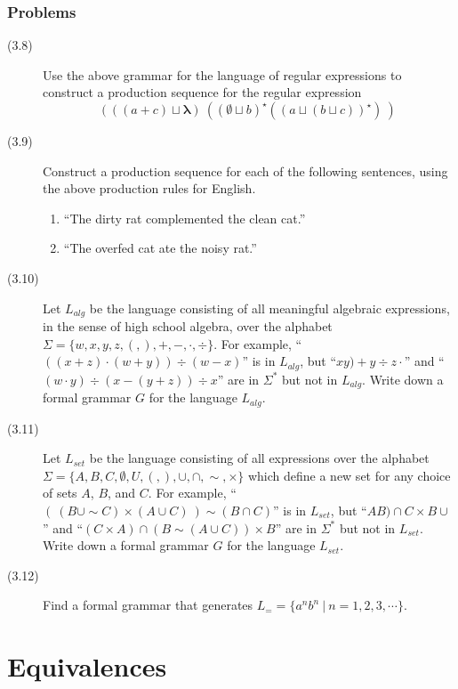 \documentclass{article}
\newcommand{\emptysetb}{\mathbf \emptyset}
\newcommand{\lambdab}{\mathbf \lambda}
\begin{document}
\subsubsection*{Problems}

\begin{description}
  \item[(3.8)] Use the above grammar for the language of regular expressions to construct a production sequence for the regular expression
    \begin{equation*}
    (\ ((a+c) \sqcup \lambdab)\ ( (\emptysetb \sqcup b)^\star ((a \sqcup (b \sqcup c))^\star ) \ )
    \end{equation*}
  \item[(3.9)] Construct a production sequence for each of the following sentences, using the above production rules for English.
    \begin{enumerate}
      \item ``The dirty rat complemented the clean cat.''
      \item ``The overfed cat ate the noisy rat.''
    \end{enumerate}
  \item[(3.10)] Let $L_{alg}$ be the language consisting of all meaningful algebraic expressions, in the sense of high school algebra, over the alphabet $\Sigma = \{ w,x,y,z,(,),+,-,\cdot,\div \}$. For example, ``$( (x+z) \cdot (w+y) ) \div (w-x)$'' is in $L_{alg}$, but ``$xy) + y \div z \cdot$'' and ``$(w \cdot y) \div (x-(y+z)) \div x$'' are in $\Sigma^*$ but not in $L_{alg}$. Write down a formal grammar $G$ for the language $L_{alg}$.
  \item[(3.11)] Let $L_{set}$ be the language consisting of all expressions over the alphabet $\Sigma = \{ A,B,C,\emptyset,U,(,),\cup,\cap,\sim,\times \}$ which define a new set for any choice of sets $A$, $B$, and $C$. For example, ``$(\ (B \cup \sim C) \times (A \cup C) \ ) \sim (B \cap C)$'' is in $L_{set}$, but ``$AB) \cap C \times B \cup$'' and ``$(C \times A) \cap (B \sim (A \cup C) ) \times B$'' are in $\Sigma^*$ but not in $L_{set}$. Write down a formal grammar $G$ for the language $L_{set}$.
  \item[(3.12)] Find a formal grammar that generates $L_= = \{ a^n b^n\ |\ n = 1,2,3,\cdots \}$.
\end{description}




\newpage

\section{Equivalences}
\end{document}
